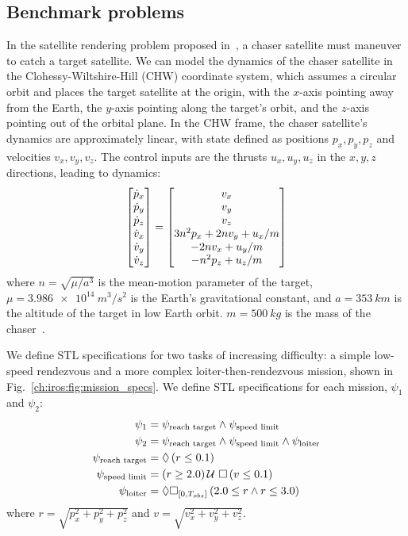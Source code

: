 \subsection{Benchmark problems}

In the satellite rendering problem proposed in~\cite{jewisonSpacecraftBenchmarkProblem2016}, a chaser satellite must maneuver to catch a target satellite. We can model the dynamics of the chaser satellite in the Clohessy-Wiltshire-Hill (CHW) coordinate system, which assumes a circular orbit and places the target satellite at the origin, with the $x$-axis pointing away from the Earth, the $y$-axis pointing along the target's orbit, and the $z$-axis pointing out of the orbital plane. In the CHW frame, the chaser satellite's dynamics are approximately linear, with state defined as positions $p_x, p_y, p_z$ and velocities $v_x, v_y, v_z$. The control inputs are the thrusts $u_x, u_y, u_z$ in the $x, y, z$ directions, leading to dynamics:
\begin{align*}
	\begin{bmatrix}\dot{p}_x              \\ \dot{p}_y \\ \dot{p}_z \\ \dot{v}_x \\ \dot{v}_y \\ \dot{v}_z\end{bmatrix} = \begin{bmatrix}
	v_x                         \\
	v_y                         \\
	v_z                         \\
	3n^2 p_x + 2n v_y + u_x / m \\
	-2n v_x + u_y / m           \\
		-n^2 p_z + u_z / m
	\end{bmatrix}
\end{align*}
where $n = \sqrt{\mu / a^3}$ is the mean-motion parameter of the target, $\mu = \SI{3.986e14}{m^3/s^2}$ is the Earth's gravitational constant, and $a = \SI{353}{km}$ is the altitude of the target in low Earth orbit. $m = \SI{500}{kg}$ is the mass of the chaser~\cite{jewisonSpacecraftBenchmarkProblem2016}.

We define STL specifications for two tasks of increasing difficulty: a simple low-speed rendezvous and a more complex loiter-then-rendezvous mission, shown in Fig.~\ref{ch:iros:fig:mission_specs}. We define STL specifications for each mission, $\psi_1$ and $\psi_2$:
\begin{align*}
	\psi_1                   & = \psi_\text{reach target} \wedge \psi_\text{speed limit}                           \\
	\psi_2                   & = \psi_\text{reach target} \wedge \psi_\text{speed limit} \wedge \psi_\text{loiter} \\
	\psi_\text{reach target} & = \lozenge \left( r \leq 0.1 \right)                                                       \\
	\psi_\text{speed limit}  & = \left( r \geq 2.0 \right) \mathcal{U}\ \square \left( v \leq 0.1 \right)                                   \\
	\psi_\text{loiter}       & = \lozenge \square_{[0, T_{obs}]} \left( 2.0 \leq r \wedge r \leq 3.0 \right)
\end{align*}
where $r = \sqrt{p_x^2 + p_y^2 + p_z^2}$ and $v = \sqrt{v_x^2 + v_y^2 + v_z^2}$.

